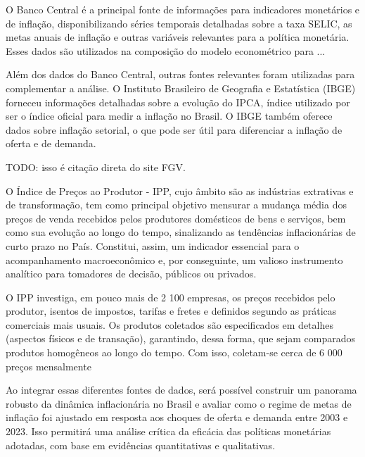 \documentclass[12pt,oneside,a4paper,chapter=TITLE,english,brazil,sumario=abnt-6027-2012]{abntex2}
\begin{document}

O Banco Central é a principal fonte de informações para indicadores monetários e de inflação, disponibilizando séries temporais detalhadas sobre a taxa SELIC, as metas anuais de inflação e outras variáveis relevantes para a política monetária. Esses dados são utilizados na composição do modelo econométrico para ...

Além dos dados do Banco Central, outras fontes relevantes foram utilizadas para complementar a análise. O Instituto Brasileiro de Geografia e Estatística (IBGE) forneceu informações detalhadas sobre a evolução do IPCA, índice utilizado por ser o índice oficial para medir a inflação no Brasil. O IBGE também oferece dados sobre inflação setorial, o que pode ser útil para diferenciar a inflação de oferta e de demanda.

TODO: isso é citação direta do site FGV.

O Índice de Preços ao Produtor - IPP, cujo âmbito são as indústrias extrativas e de transformação, tem como principal objetivo mensurar a mudança média dos preços de venda recebidos pelos produtores domésticos de bens e serviços, bem como sua evolução ao longo do tempo, sinalizando as tendências inflacionárias de curto prazo no País. Constitui, assim, um indicador essencial para o acompanhamento macroeconômico e, por conseguinte, um valioso instrumento analítico para tomadores de decisão, públicos ou privados.

O IPP investiga, em pouco mais de 2 100 empresas, os preços recebidos pelo produtor, isentos de impostos, tarifas e fretes e definidos segundo as práticas comerciais mais usuais. Os produtos coletados são especificados em detalhes (aspectos físicos e de transação), garantindo, dessa forma, que sejam comparados produtos homogêneos ao longo do tempo. Com isso, coletam-se cerca de 6 000 preços mensalmente


Ao integrar essas diferentes fontes de dados, será possível construir um panorama robusto da dinâmica inflacionária no Brasil e avaliar como o regime de metas de inflação foi ajustado em resposta aos choques de oferta e demanda entre 2003 e 2023. Isso permitirá uma análise crítica da eficácia das políticas monetárias adotadas, com base em evidências quantitativas e qualitativas.
\end{document}
